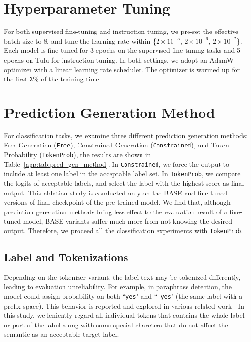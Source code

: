 \section{Hyperparameter Tuning}
\label{sec:app:hyperparameter}
For both supervised fine-tuning and instruction tuning, we pre-set the effective batch size to 8, and tune the learning rate within \{$2\times 10^{-5}$, $2\times 10^{-6}$, $2\times 10^{-7}$\}.
Each model is fine-tuned for 3 epochs on the supervised fine-tuning tasks and 5 epochs on Tulu for instruction tuning.
In both settings, we adopt an AdamW optimizer with a linear learning rate scheduler.
The optimizer is warmed up for the first $3\%$ of the training time.

\section{Prediction Generation Method}
\label{app:pred_gen}

For classification tasks, we examine three different prediction generation methods: Free Generation (\texttt{Free}), Constrained Generation (\texttt{Constrained}), and Token Probability (\texttt{TokenProb}), the results are shown in Table~\ref{app:tab:pred_gen_method}.
In \texttt{Constrained}, we force the output to include at least one label in the acceptable label set.
In \texttt{TokenProb}, we compare the logits of acceptable labels, and select the label with the highest score as final output.
This ablation study is conducted only on the BASE and fine-tuned versions of final checkpoint of the pre-trained model.
We find that, although prediction generation methods bring less effect to the evaluation result of a fine-tuned model, BASE variants suffer much more from not knowing the desired output.
Therefore, we proceed all the classification experiments with \texttt{TokenProb}.

\subsection{Label and Tokenizations}
Depending on the tokenizer variant, the label text may be tokenized differently, leading to evaluation unreliability.
For example, in paraphrase detection, the model could assign probability on both ``\texttt{yes}" and ``\texttt{ yes}" (the same label with a prefix space).
This behavior is reported and explored in various related work \cite{sun-etal-2023-tokenization, batsuren2024evaluating, singh2024tokenization}.
In this study, we leniently regard all individual tokens that contains the whole label or part of the label along with some special charcters that do not affect the semantic as an acceptable target label.



